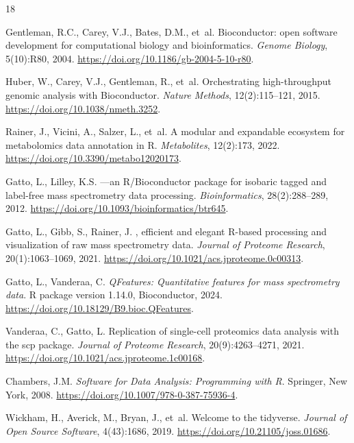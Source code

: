 \documentclass[11pt,twoside,openright]{book}
\begin{document}
\FloatBarrier
\begin{thebibliography}{18}

Gentleman, R.C., Carey, V.J., Bates, D.M., et~al.
\newblock Bioconductor: open software development for computational biology and bioinformatics.
\newblock \emph{Genome Biology}, 5(10):R80, 2004.
\newblock \url{https://doi.org/10.1186/gb-2004-5-10-r80}.

Huber, W., Carey, V.J., Gentleman, R., et~al.
\newblock Orchestrating high-throughput genomic analysis with {Bioconductor}.
\newblock \emph{Nature Methods}, 12(2):115--121, 2015.
\newblock \url{https://doi.org/10.1038/nmeth.3252}.

Rainer, J., Vicini, A., Salzer, L., et~al.
\newblock A modular and expandable ecosystem for metabolomics data annotation in {R}.
\newblock \emph{Metabolites}, 12(2):173, 2022.
\newblock \url{https://doi.org/10.3390/metabo12020173}.

Gatto, L., Lilley, K.S.
---an {R/Bioconductor} package for isobaric tagged and label-free mass spectrometry data processing.
\newblock \emph{Bioinformatics}, 28(2):288--289, 2012.
\newblock \url{https://doi.org/10.1093/bioinformatics/btr645}.

Gatto, L., Gibb, S., Rainer, J.
, efficient and elegant {R}-based processing and visualization of raw mass spectrometry data.
\newblock \emph{Journal of Proteome Research}, 20(1):1063--1069, 2021.
\newblock \url{https://doi.org/10.1021/acs.jproteome.0c00313}.

Gatto, L., Vanderaa, C.
\newblock \emph{QFeatures: Quantitative features for mass spectrometry data}.
\newblock R package version 1.14.0, Bioconductor, 2024.
\newblock \url{https://doi.org/10.18129/B9.bioc.QFeatures}.

Vanderaa, C., Gatto, L.
\newblock Replication of single-cell proteomics data analysis with the {scp} package.
\newblock \emph{Journal of Proteome Research}, 20(9):4263--4271, 2021.
\newblock \url{https://doi.org/10.1021/acs.jproteome.1c00168}.

Chambers, J.M.
\newblock \emph{Software for Data Analysis: Programming with {R}}.
\newblock Springer, New York, 2008.
\newblock \url{https://doi.org/10.1007/978-0-387-75936-4}.

Wickham, H., Averick, M., Bryan, J., et~al.
\newblock Welcome to the {tidyverse}.
\newblock \emph{Journal of Open Source Software}, 4(43):1686, 2019.
\newblock \url{https://doi.org/10.21105/joss.01686}.


\end{thebibliography}
\end{document}
